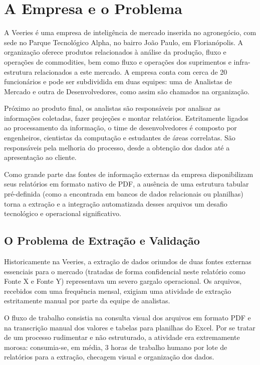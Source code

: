 \chapter{A Empresa e o Problema} 

A Veeries é uma empresa de inteligência de mercado inserida no agronegócio, com sede no Parque Tecnológico Alpha, no bairro João Paulo, em Florianópolis. A organização oferece produtos relacionados à análise da produção, fluxo e operações de commodities, bem como fluxo e operações dos suprimentos e infra-estrutura relacionados a este mercado. A empresa conta com cerca de 20 funcionários e pode ser subdividida em duas equipes: uma de Analistas de Mercado e outra de Desenvolvedores, como assim são chamados na organização. 

Próximo ao produto final, os analistas são responsáveis por analisar as informações coletadas, fazer projeções e montar relatórios. Estritamente ligados ao processamento da informação, o time de desenvolvedores é composto por engenheiros, cientistas da computação e estudantes de áreas correlatas. São responsáveis pela melhoria do processo, desde a obtenção dos dados até a apresentação ao cliente. 

Como grande parte das fontes de informação externas da empresa disponibilizam seus relatórios em formato nativo de PDF, a ausência de uma estrutura tabular pré-definida (como a encontrada em bancos de dados relacionais ou planilhas) torna a extração e a integração automatizada desses arquivos um desafio tecnológico e operacional significativo.

\section{O Problema de Extração e Validação}

Historicamente na Veeries, a extração de dados oriundos de duas fontes externas essenciais para o mercado (tratadas de forma confidencial neste relatório como Fonte X e Fonte Y) representava um severo gargalo operacional. Os arquivos, recebidos com uma frequência mensal, exigiam uma atividade de extração estritamente manual por parte da equipe de analistas. 

O fluxo de trabalho consistia na consulta visual dos arquivos em formato PDF e na transcrição manual dos valores e tabelas para planilhas do Excel. Por se tratar de um processo rudimentar e não estruturado, a atividade era extremamente morosa: consumia-se, em média, 3 horas de trabalho humano por lote de relatórios para a extração, checagem visual e organização dos dados.


